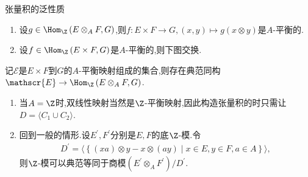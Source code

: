 \begin{proposition}{张量积的泛性质}{}
	\begin{enumerate}
		\item 设$g\in\Hom_{\Z}\left(E\otimes_{A}F,G\right)$,则$f:E\times F\to G,\left(x,y\right)\mapsto g\left(x\otimes y\right)$是$A$-平衡的.
		\item 设$f\in\Hom_{\Z}\left(E\times F,G\right)$是$A$-平衡的,则下图交换.
		\begin{center}
		\end{center}
	\end{enumerate}
\end{proposition}

\begin{corollary}{}{}
	记$\mathscr{E}$是$E\times F$到$G$的$A$-平衡映射组成的集合,则存在典范同构$\mathscr{E}\to\Hom_{\Z}\left(E\otimes_{A}F,G\right)$.
\end{corollary}

\begin{remark}{}{}
	\begin{enumerate}
		\item 当$A=\Z$时,双线性映射当然是$\Z$-平衡映射,因此构造张量积的时只需让$D=\langle C_{1}\cup C_{2}\rangle$.
		\item 回到一般的情形.设$E^{\prime},F^{\prime}$分别是$E,F$的底$\Z$-模.令
		\begin{align*}
			D^{\prime}=\langle\left\{\left(xa\right)\otimes y-x\otimes\left(ay\right)\middle|x\in E,y\in F,a\in A\right\}\rangle,
		\end{align*}
		则$\Z$-模可以典范等同于商模$\left(E^{\prime}\otimes_{A}F^{\prime}\right)/D^{\prime}$.
	\end{enumerate}
\end{remark}

